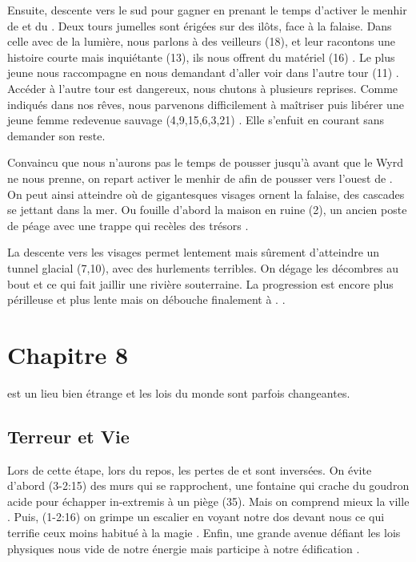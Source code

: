\documentclass[11pt]{article}
\begin{document}
Ensuite, descente vers le sud pour gagner \cornes{} en prenant le temps d'activer le menhir de \debacle{} et du \tumulus{}. Deux tours jumelles sont érigées sur des ilôts, face à la falaise. Dans celle avec de la lumière, nous parlons à des veilleurs (18), et leur racontons une histoire courte mais inquiétante (13), ils nous offrent du matériel (16) . Le plus jeune nous raccompagne en nous demandant d'aller voir dans l'autre tour (11) . Accéder à l'autre tour est dangereux, nous chutons à plusieurs reprises. Comme indiqués dans nos rêves, nous parvenons difficilement à maîtriser puis libérer une jeune femme redevenue sauvage (4,9,15,6,3,21) . Elle s'enfuit en courant sans demander son reste.

Convaincu que nous n'aurons pas le temps de pousser jusqu'à \larvebois{} avant que le Wyrd ne nous prenne, on repart activer le menhir de \bordwyrd{} afin de pousser vers l'ouest de \devastation{}. On peut ainsi atteindre \ondechute{} où de gigantesques visages ornent la falaise, des cascades se jettant dans la mer. Ou fouille d'abord la maison en ruine (2), un ancien poste de péage  avec une trappe qui recèles des trésors .

La descente vers les visages permet lentement mais sûrement d'atteindre un tunnel glacial (7,10), avec des hurlements terribles. On dégage les décombres au bout et  ce qui fait jaillir une rivière souterraine. La progression est encore plus périlleuse et plus lente mais  on débouche finalement à \tuathan{}. .


\section{Chapitre 8}

\tuathan{} est un lieu bien étrange et les lois du monde sont parfois changeantes.

\subsection{Terreur et Vie}
Lors de cette étape, lors du repos, les pertes de \life{} et \terror{} sont inversées. On évite d'abord (3-2:15) des murs qui se rapprochent, une fontaine qui crache du goudron acide pour échapper in-extremis à un piège (35). Mais on comprend mieux la ville . Puis, (1-2:16) on grimpe un escalier en voyant notre dos devant nous ce qui terrifie ceux moins habitué à la magie . Enfin, une grande avenue défiant les lois physiques nous vide de notre énergie mais participe à notre édification .
\end{document}
